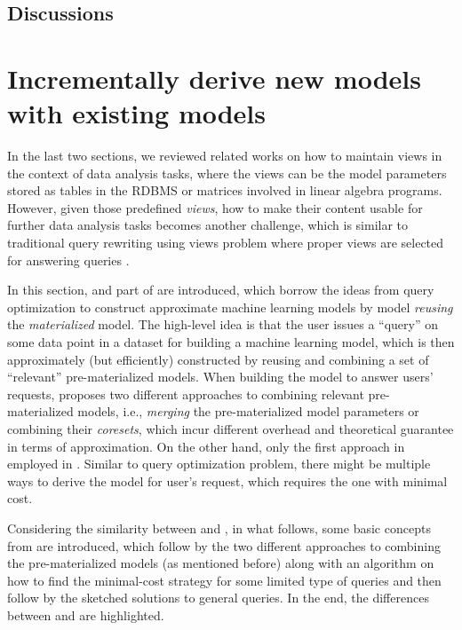 \subsection{Discussions}

\section{Incrementally derive new models with existing models}
In the last two sections, we reviewed related works on how to maintain views in the context of data analysis tasks, where the views can be the model parameters stored as tables in the RDBMS or matrices involved in linear algebra programs. However, given those predefined {\em views}, how to make their content usable for further data analysis tasks becomes another challenge, which is similar to traditional query rewriting using views problem where proper views are selected for answering queries \cite{halevy2001answering}.

In this section, \cite{hasani2018efficient} and part of \cite{gupta2015processing} are introduced, which borrow the ideas from query optimization to construct approximate machine learning models by model {\em reusing} the {\em materialized} model. The high-level idea is that the user issues a ``query'' on some data point in a dataset for building a machine learning model, which is then approximately (but efficiently) constructed by reusing and combining a set of ``relevant'' pre-materialized models. When building the model to answer users' requests, \cite{hasani2018efficient} proposes two different approaches to combining relevant pre-materialized models, i.e., {\em merging} the pre-materialized model parameters or combining their {\em coresets}, which incur different overhead and theoretical guarantee in terms of approximation.  On the other hand, only the first approach in employed in \cite{gupta2015processing}. Similar to query optimization problem, there might be multiple ways to derive the model for user's request, which requires the one with minimal cost.

Considering the similarity between \cite{hasani2018efficient} and \cite{gupta2015processing}, in what follows, some basic concepts from \cite{hasani2018efficient} are introduced, which follow by the two different approaches to combining the pre-materialized models (as mentioned before) along with an algorithm on how to find the minimal-cost strategy for some limited type of queries and then follow by the sketched solutions to general queries. In the end, the differences between \cite{hasani2018efficient} and \cite{gupta2015processing} are highlighted.


